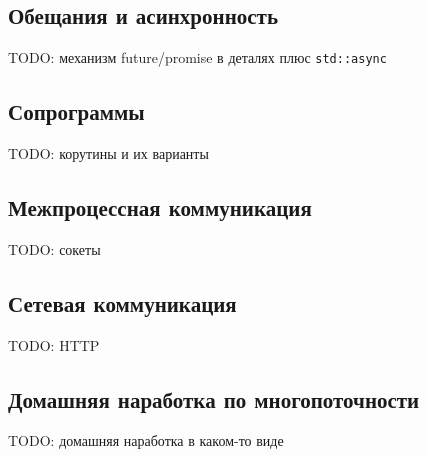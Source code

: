 \documentclass[a4paper,12pt,oneside]{article}
\begin{document}
\pagebreak
\subsection{Обещания и асинхронность}

TODO: механизм future/promise в деталях плюс \lstinline!std::async!

\pagebreak
\subsection{Сопрограммы}

TODO: корутины и их варианты

\pagebreak
\subsection{Межпроцессная коммуникация}

TODO: сокеты

\pagebreak
\subsection{Сетевая коммуникация}

TODO: HTTP

\pagebreak
\subsection{Домашняя наработка по многопоточности}

TODO: домашняя наработка в каком-то виде

\fi

\pagebreak
{}

\pagebreak
{}
{}
\listoffigures
\end{document}
